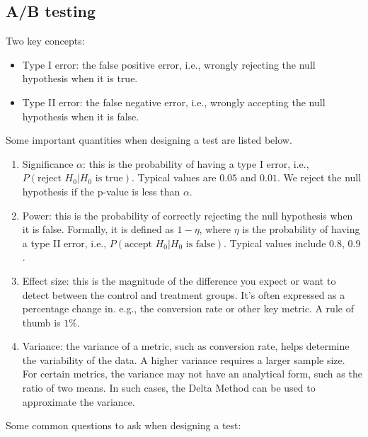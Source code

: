     \subsection{A/B testing}
        Two key concepts:
            \begin{itemize}
                \item Type I error: the false positive error, i.e., wrongly rejecting the null hypothesis when it is true.
                \item Type II error: the false negative error, i.e., wrongly accepting the null hypothesis when it is false. 
            \end{itemize}
        Some important quantities when designing a test are listed below.
            \begin{enumerate}
                \item Significance $\alpha$: this is the probability of having a type I error, i.e., $P(\text{reject $H_0$} | \text{$H_0$ is true} )$. Typical values are $0.05$ and $0.01$. We reject the null hypothesis if the p-value is less than $\alpha$.
                
                \item Power: this is the probability of correctly rejecting the null hypothesis when it is false. Formally, it is defined as $1 - \eta$, where $\eta$ is the probability of having a type II error, i.e., $P(\text{accept $H_0$} | \text{$H_0$ is false})$. Typical values include $0.8$, $0.9$.
                
                \item Effect size: this is the magnitude of the difference you expect or want to detect between the control and treatment groups. It's often expressed as a percentage change in. e.g.,  the conversion rate or other key metric. A rule of thumb is $1\%$.

                
                \item Variance: the variance of a metric, such as conversion rate, helps determine the variability of the data. A higher variance requires a larger sample size. For certain metrics, the variance may not have an analytical form, such as the ratio of two means. In such cases, the Delta Method can be used to approximate the variance.

                
            \end{enumerate}
        Some common questions to ask when designing a test:
